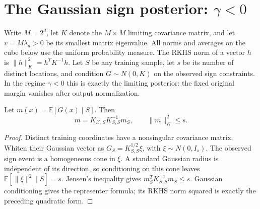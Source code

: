 
\section{The Gaussian sign posterior: \texorpdfstring{$\gamma<0$}{gamma < 0}}
\label{sec:negative-gamma}

Write $M=2^d$, let $K$ denote the $M\times M$ limiting covariance
matrix, and let $v=M\lambda_d>0$ be its smallest matrix eigenvalue.
All norms and averages on the cube below use the uniform probability
measure.  The RKHS norm of a vector $h$ is
$\|h\|_K^2=h^TK^{-1}h$.
Let $S$ be any training sample, let $s$ be its number of distinct
locations, and condition $G\sim N(0,K)$ on the observed sign constraints.
In the regime $\gamma<0$ this is exactly the limiting posterior: the
fixed original margin vanishes after output normalization.

\begin{lemma}
\label{lem:sign-mean-norm}
Let $m(x)=\mathbb E[G(x)\mid S]$.  Then
\[
 m=K_{\mathcal X,S}K_{S,S}^{-1}m_S,
 \qquad \|m\|_K^2\le s.
\]
\end{lemma}
\begin{proof}
Distinct training coordinates have a nonsingular covariance matrix.
Whiten their Gaussian vector as $G_S=K_{S,S}^{1/2}\xi$, with
$\xi\sim N(0,I_s)$.  The observed sign event is a homogeneous cone
in $\xi$.  A standard Gaussian radius is independent of its direction,
so conditioning on this cone leaves
$\mathbb E[\|\xi\|^2\mid S]=s$.  Jensen's inequality gives
$m_S^TK_{S,S}^{-1}m_S\le s$.  Gaussian conditioning gives the
representer formula; its RKHS norm squared is exactly the preceding
quadratic form.
\end{proof}


